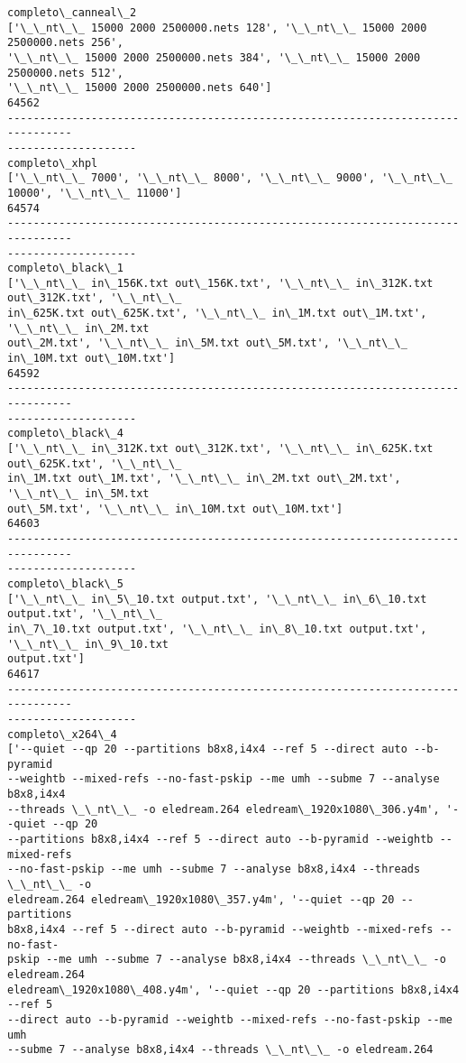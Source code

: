 \documentclass[11pt]{article}
\begin{document}
    \begin{Verbatim}[commandchars=\\\{\}]
completo\_canneal\_2
['\_\_nt\_\_ 15000 2000 2500000.nets 128', '\_\_nt\_\_ 15000 2000 2500000.nets 256',
'\_\_nt\_\_ 15000 2000 2500000.nets 384', '\_\_nt\_\_ 15000 2000 2500000.nets 512',
'\_\_nt\_\_ 15000 2000 2500000.nets 640']
64562
--------------------------------------------------------------------------------
--------------------
completo\_xhpl
['\_\_nt\_\_ 7000', '\_\_nt\_\_ 8000', '\_\_nt\_\_ 9000', '\_\_nt\_\_ 10000', '\_\_nt\_\_ 11000']
64574
--------------------------------------------------------------------------------
--------------------
completo\_black\_1
['\_\_nt\_\_ in\_156K.txt out\_156K.txt', '\_\_nt\_\_ in\_312K.txt out\_312K.txt', '\_\_nt\_\_
in\_625K.txt out\_625K.txt', '\_\_nt\_\_ in\_1M.txt out\_1M.txt', '\_\_nt\_\_ in\_2M.txt
out\_2M.txt', '\_\_nt\_\_ in\_5M.txt out\_5M.txt', '\_\_nt\_\_ in\_10M.txt out\_10M.txt']
64592
--------------------------------------------------------------------------------
--------------------
completo\_black\_4
['\_\_nt\_\_ in\_312K.txt out\_312K.txt', '\_\_nt\_\_ in\_625K.txt out\_625K.txt', '\_\_nt\_\_
in\_1M.txt out\_1M.txt', '\_\_nt\_\_ in\_2M.txt out\_2M.txt', '\_\_nt\_\_ in\_5M.txt
out\_5M.txt', '\_\_nt\_\_ in\_10M.txt out\_10M.txt']
64603
--------------------------------------------------------------------------------
--------------------
completo\_black\_5
['\_\_nt\_\_ in\_5\_10.txt output.txt', '\_\_nt\_\_ in\_6\_10.txt output.txt', '\_\_nt\_\_
in\_7\_10.txt output.txt', '\_\_nt\_\_ in\_8\_10.txt output.txt', '\_\_nt\_\_ in\_9\_10.txt
output.txt']
64617
--------------------------------------------------------------------------------
--------------------
completo\_x264\_4
['--quiet --qp 20 --partitions b8x8,i4x4 --ref 5 --direct auto --b-pyramid
--weightb --mixed-refs --no-fast-pskip --me umh --subme 7 --analyse b8x8,i4x4
--threads \_\_nt\_\_ -o eledream.264 eledream\_1920x1080\_306.y4m', '--quiet --qp 20
--partitions b8x8,i4x4 --ref 5 --direct auto --b-pyramid --weightb --mixed-refs
--no-fast-pskip --me umh --subme 7 --analyse b8x8,i4x4 --threads \_\_nt\_\_ -o
eledream.264 eledream\_1920x1080\_357.y4m', '--quiet --qp 20 --partitions
b8x8,i4x4 --ref 5 --direct auto --b-pyramid --weightb --mixed-refs --no-fast-
pskip --me umh --subme 7 --analyse b8x8,i4x4 --threads \_\_nt\_\_ -o eledream.264
eledream\_1920x1080\_408.y4m', '--quiet --qp 20 --partitions b8x8,i4x4 --ref 5
--direct auto --b-pyramid --weightb --mixed-refs --no-fast-pskip --me umh
--subme 7 --analyse b8x8,i4x4 --threads \_\_nt\_\_ -o eledream.264

\end{Verbatim}
\end{document}
